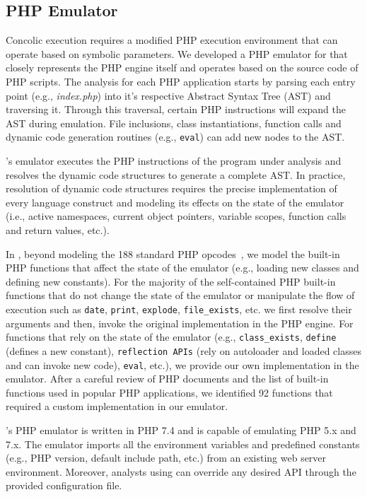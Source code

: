 \subsection{PHP Emulator}
Concolic execution requires a modified PHP execution environment that can operate based on symbolic parameters. 
We developed a PHP emulator for \animatedead{} that closely represents the PHP engine itself and operates based on the source code of PHP scripts. 
The analysis for each PHP application starts by parsing each entry point (e.g., \emph{index.php}) into it's respective Abstract Syntax Tree (AST) and traversing it. 
Through this traversal, certain PHP instructions will expand the AST during emulation. 
File inclusions, class instantiations, function calls and dynamic code generation routines (e.g., \texttt{eval}) can add new nodes to the AST. 

\animatedead{}'s emulator executes the PHP instructions of the program under analysis and resolves the dynamic code structures to generate a complete AST. 
In practice, resolution of dynamic code structures requires the precise implementation of every language construct and modeling its effects on the state of the emulator (i.e., active namespaces, current object pointers, variable scopes, function calls and return values, etc.). 

In \animatedead{}, beyond modeling the 188 standard PHP opcodes~\cite{popov}, we model the built-in PHP functions that affect the state of the emulator (e.g., loading new classes and defining new constants). 
For the majority of the self-contained PHP built-in functions that do not change the state of the emulator or manipulate the flow of execution such as \texttt{date}, \texttt{print}, \texttt{explode}, \texttt{file\_exists}, etc. we first resolve their arguments and then, invoke the original implementation in the PHP engine. 
For functions that rely on the state of the emulator (e.g., \texttt{class\_exists}, \texttt{define} (defines a new constant), \texttt{reflection APIs} (rely on autoloader and loaded classes and can invoke new code), \texttt{eval}, etc.), we provide our own implementation in the emulator. 
After a careful review of PHP documents and the list of built-in functions used in popular PHP applications, we identified 92 functions that required a custom implementation in our emulator. 

\animatedead{}'s PHP emulator is written in PHP 7.4 and is capable of emulating PHP 5.x and 7.x. 
The emulator imports all the environment variables and predefined constants (e.g., PHP version, default include path, etc.) from an existing web server environment. 
Moreover, analysts using \animatedead{} can override any desired API through the provided configuration file. 

